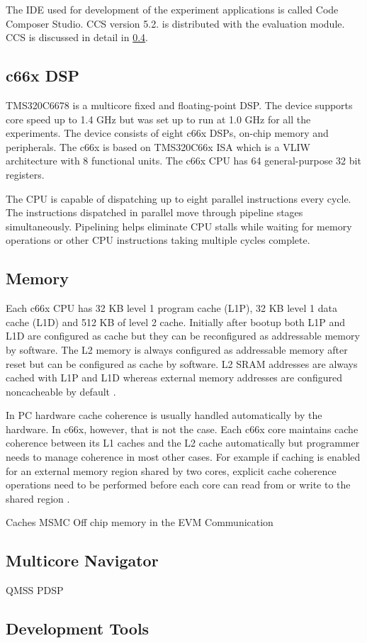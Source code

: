 The IDE used for development of the experiment applications is called Code
Composer Studio. CCS version 5.2. is distributed with the evaluation module.
CCS is discussed in detail in \ref{subsec:devtools}.

\subsection{c66x DSP}
TMS320C6678 is a multicore fixed and floating-point DSP. The device supports
core speed up to 1.4 GHz but was set up to run at 1.0 GHz for all the
experiments. The device consists of eight c66x DSPs, on-chip memory and
peripherals. The c66x is based on TMS320C66x ISA which is a VLIW architecture
with 8 functional units. The c66x CPU has 64 general-purpose 32 bit registers.
\cite{sprugh7}

The CPU is capable of dispatching up to eight parallel instructions every
cycle. The instructions dispatched in parallel move through pipeline stages
simultaneously. Pipelining helps eliminate CPU stalls while waiting for memory
operations or other CPU instructions taking multiple cycles complete.
\cite{sprugh7}

\subsection{Memory}
\label{subsec:c66memory}
Each c66x CPU has 32 KB level 1 program cache (L1P), 32 KB level 1 data cache
(L1D) and 512 KB of level 2 cache. Initially after bootup both L1P and L1D are
configured as cache but they can be reconfigured as addressable memory by
software. The L2 memory is always configured as addressable memory after reset
but can be configured as cache by software. \cite{tmsdatasheet} L2 SRAM
addresses are always cached with L1P and L1D whereas external memory addresses
are configured noncacheable by default \cite{cacheguide}.

In PC hardware cache coherence is usually handled automatically by the hardware.
In c66x, however, that is not the case. Each c66x core maintains cache coherence
between its L1 caches and the L2 cache automatically but programmer needs to
manage coherence in most other cases. For example if caching is enabled
for an external memory region shared by two cores, explicit cache coherence
operations need to be performed before each core can read from or write to the
shared region \cite{cacheguide}.

Caches
MSMC
Off chip memory in the EVM
Communication
\subsection{Multicore Navigator}
\label{subsec:multicorenav}
QMSS
PDSP
\subsection{Development Tools}
\label{subsec:devtools}

